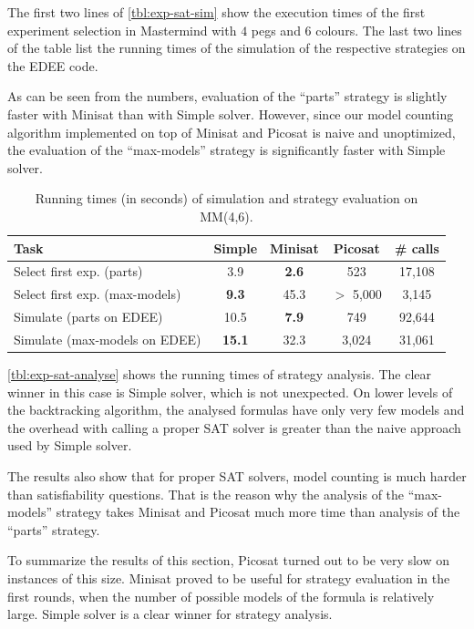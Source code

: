 The first two lines of \autoref{tbl:exp-sat-sim} show the execution times of the
  first experiment selection in Mastermind with $4$ pegs and $6$ colours.
The last two lines of the table list the running times of the simulation of
  the respective strategies on the EDEE code.

As can be seen from the numbers, evaluation of the ``parts'' strategy is slightly
  faster with Minisat than with Simple solver.
However, since our model counting algorithm implemented on top of Minisat and Picosat
  is naive and unoptimized, the evaluation of the ``max-models'' strategy
  is significantly faster with Simple solver.

\begin{table}[ht]
\begin{center}
\begin{tabular}{|l|c|c|c|c|} \hline
Task & Simple & Minisat & Picosat & \# calls \\ \hline
Select first exp. (parts) & 3.9 & \textbf{2.6} & 523 & 17,108 \\
Select first exp. (max-models) & \textbf{9.3} & 45.3 & $>$ 5,000 & 3,145 \\
Simulate (parts on EDEE) & 10.5 & \textbf{7.9} & 749 & 92,644 \\
Simulate (max-models on EDEE) & \textbf{15.1} & 32.3 & 3,024 & 31,061 \\\hline
\end{tabular}
\caption{Running times (in seconds) of simulation and strategy evaluation on MM(4,6).}
\label{tbl:exp-sat-sim}
\end{center}
\end{table}

\autoref{tbl:exp-sat-analyse}
  shows the running times of strategy analysis.
The clear winner in this case is Simple solver, which is not unexpected.
On lower levels of the backtracking algorithm,
  the analysed formulas have only very few models and the
  overhead with calling a proper SAT solver is greater
  than the naive approach used by Simple solver.

The results also show that for proper SAT solvers,
  model counting is much harder than satisfiability questions.
That is the reason why the analysis of the ``max-models'' strategy takes Minisat and Picosat
  much more time than analysis of the ``parts'' strategy.

To summarize the results of this section,
Picosat turned out to be very slow on instances of this size. Minisat proved to be
useful for strategy evaluation in the first rounds, when the number of possible
models of the formula is relatively large.
Simple solver is a clear winner for strategy analysis.


